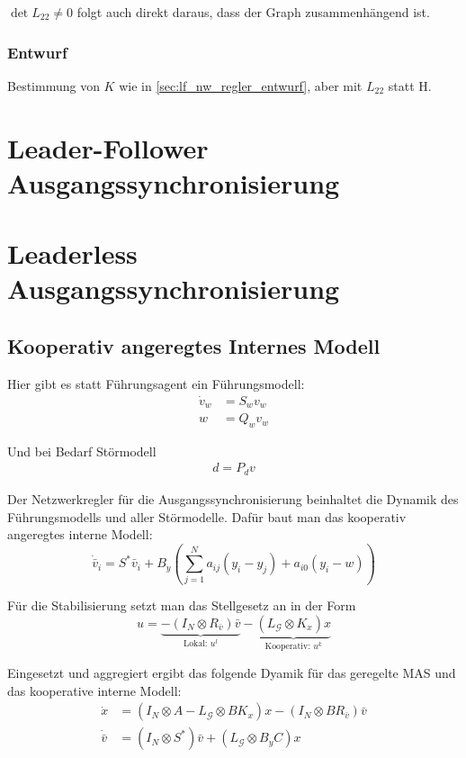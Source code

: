$\det L_{22} \neq 0$ folgt auch direkt daraus, dass der Graph zusammenhängend ist.

\subsubsection{Entwurf}
Bestimmung von $K$ wie in \ref{sec:lf_nw_regler_entwurf},
aber mit $L_{22}$ statt H.


\pagebreak
\section{Leader-Follower Ausgangssynchronisierung}

\pagebreak
\section{Leaderless Ausgangssynchronisierung}
\subsection{Kooperativ angeregtes Internes Modell}
Hier gibt es statt Führungsagent ein Führungsmodell:
\begin{align}
    \dot{v}_w &= S_w v_w \\
    w &= Q_w v_w
\end{align}


Und bei Bedarf Störmodell
\begin{align}
    d = P_d v
\end{align}

Der Netzwerkregler für die Ausgangssynchronisierung beinhaltet die
Dynamik des Führungsmodells und aller Störmodelle.
Dafür baut man das kooperativ angeregtes interne Modell:
\begin{equation}
    \dot{\bar{v}}_i = S^*\bar{v}_i + B_y\left(\sum_{j=1}^N a_{ij} (y_i-y_j) + a_{i0} (y_i-w) \right)
\end{equation}



Für die Stabilisierung setzt man das Stellgesetz an in der Form
\begin{equation}
    u=\underbrace{-(I_N \otimes R_{\bar{v}})\bar{v}}_{\text{Lokal: }u^l} - \underbrace{(L_{\mathcal{G}} \otimes K_x)x}_{\text{Kooperativ: }u^k}
\end{equation}

Eingesetzt und aggregiert ergibt das folgende Dyamik für das geregelte MAS und das kooperative
interne Modell:
\begin{align}
    \dot{x} &= (I_N \otimes A - L_{\mathcal{G}} \otimes BK_x) x - (I_N \otimes BR_{\bar{v}})\bar{v} \\
    \dot{\bar{v}} &= (I_N \otimes S^*)\bar{v} + (L_{\mathcal{G}}\otimes B_y C)x
\end{align}

